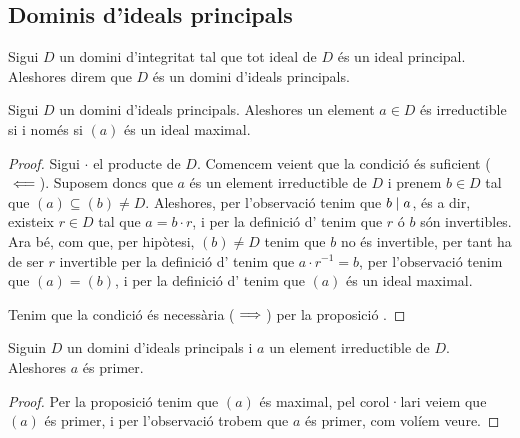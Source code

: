 \documentclass[../Apunts.tex]{subfiles}
\begin{document}
	\subsection{Dominis d'ideals principals}
	\begin{definition}
		\label{def:domini d'ideals principals}
		\label{def:DIP}
		Sigui \(D\) un domini d'integritat tal que tot ideal de \(D\) és un ideal principal. Aleshores direm que \(D\) és un domini d'ideals principals.
	\end{definition}
	\begin{proposition}
		\label{prop:irreductible sii ideal maximal}
		Sigui \(D\) un domini d'ideals principals. Aleshores un element \(a\in D\) és irreductible si i només si \((a)\) és un ideal maximal.
		\begin{proof}
			Sigui \(\cdot\) el producte de \(D\). Comencem veient que la condició és suficient (\(\impliedby\)). Suposem doncs que \(a\) és un element irreductible de \(D\) i prenem \(b\in D\) tal que \((a)\subseteq(b)\neq D\). Aleshores, per l'observació  tenim que \(b\mathrel{|} a\), és a dir, existeix \(r\in D\) tal que \(a=b\cdot r\), i per la definició d' tenim que \(r\) ó \(b\) són invertibles. Ara bé, com que, per hipòtesi, \((b)\neq D\) tenim que \(b\) no és invertible, %
			per tant ha de ser \(r\) invertible per la definició d' tenim que \(a\cdot r^{-1}=b\), per l'observació  tenim que \((a)=(b)\), i per la definició d' tenim que \((a)\) és un ideal maximal.
			
			Tenim que la condició és necessària (\(\implies\)) per la proposició . %
		\end{proof}
	\end{proposition}
	\begin{proposition}
		\label{prop:en DIP irreductible implica primer}
		Siguin \(D\) un domini d'ideals principals i \(a\) un element irreductible de \(D\). Aleshores \(a\) és primer.
		\begin{proof}
			Per la proposició  tenim que \((a)\) és maximal, pel corol·lari  veiem que \((a)\) és primer, i per l'observació  trobem que \(a\) és primer, com volíem veure.
		\end{proof}
	\end{proposition}
\end{document}

